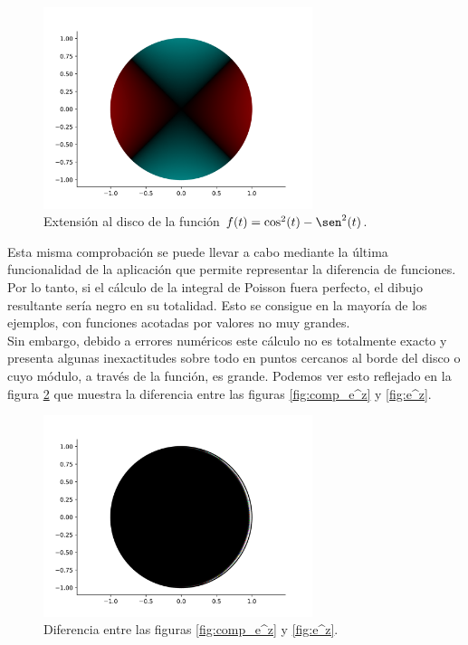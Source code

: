 \begin{figure}[!htbp]
    \centering
    \includegraphics[width=0.7\textwidth]{../Aplicacion/cos^2(t)-sen^2(t).png}
    \caption{Extensión al disco de la función $f(t) = \cos^2(t) - \sen^2(t)$.}
    \label{fig:comparacion4}
\end{figure}

Esta misma comprobación se puede llevar a cabo mediante la última funcionalidad de la aplicación que permite representar la diferencia de funciones. Por lo tanto, si el cálculo de la integral de Poisson fuera perfecto, el dibujo resultante sería negro en su totalidad. Esto se consigue en la mayoría de los ejemplos, con funciones acotadas por valores no muy grandes. \\

Sin embargo, debido a errores numéricos este cálculo no es totalmente exacto y presenta algunas inexactitudes sobre todo en puntos cercanos al borde del disco o cuyo módulo, a través de la función, es grande. Podemos ver esto reflejado en la figura \ref{fig:diferencia} que muestra la diferencia entre las figuras \ref{fig:comp_e^z} y \ref{fig:e^z}. \\

\begin{figure}[!htbp]
    \centering
    \includegraphics[width=0.7\textwidth]{../Aplicacion/diff_e^z.png}
    \caption{Diferencia entre las figuras \ref{fig:comp_e^z} y \ref{fig:e^z}.}
    \label{fig:diferencia}
\end{figure}

